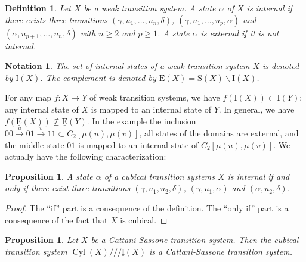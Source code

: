 \documentclass[a4paper,12pt]{amsart}
\newtheorem{prop}[thm]{Proposition}
\newtheorem{defn}[thm]{Definition}
\newtheorem{nota}[thm]{Notation}
\begin{document}
\begin{defn} \cite{biscsts1} Let $X$ be a weak transition system. A state
$\alpha$ of $X$ is {\rm internal} if there exists three transitions
$(\gamma,u_1,\dots,u_n,\delta)$, $(\gamma,u_1,\dots,u_p,\alpha)$ and
$(\alpha,u_{p+1},\dots,u_n,\delta)$ with $n{\geqslant} 2$ and $p{\geqslant} 1$. A
state $\alpha$ is {\rm external} if it is not internal. \end{defn}

\begin{nota} The set of internal states of a weak transition system
  $X$ is denoted by $\operatorname{\underline{I}}(X)$. The complement is denoted by
  $\operatorname{\underline{E}}(X)=\operatorname{\underline{S}}(X) \backslash \operatorname{\underline{I}}(X)$. \end{nota}

For any map $f:X\to Y$ of weak transition systems, we have $f(\operatorname{\underline{I}}(X))
\subset \operatorname{\underline{I}}(Y)$: any internal state of $X$ is mapped to an internal
state of $Y$. In general, we have $f(\operatorname{\underline{E}}(X)) \nsubseteq \operatorname{\underline{E}}(Y)$. In
the example the inclusion $00\stackrel{u}\longrightarrow 01
\stackrel{v}\longrightarrow 11 \subset C_2[\mu(u),\mu(v)]$, all
states of the domains are external, and the middle state $01$ is
mapped to an internal state of $C_2[\mu(u),\mu(v)]$. We actually have
the following characterization:

\begin{prop} \label{int_charac} A state $\alpha$ of a cubical transition
systems $X$ is internal if and only if there exist three transitions
$(\gamma,u_1,u_2,\delta)$, $(\gamma,u_1,\alpha)$ and
$(\alpha,u_2,\delta)$. \end{prop}

\begin{proof} The ``if'' part is a consequence of the definition. The ``only
if'' part is a consequence of the fact that $X$ is cubical.
\end{proof}

\begin{prop} \label{precalcul} Let $X$ be a Cattani-Sassone transition
system. Then the cubical transition system $\operatorname{{Cyl}}(X)/// \operatorname{\underline{I}}(X)$ is a
Cattani-Sassone transition system.  \end{prop}
\end{document}
